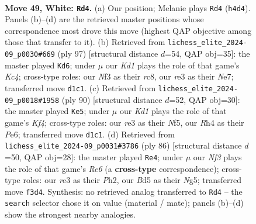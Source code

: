 \documentclass[11pt]{article}
\begin{document}
\clearpage

\begin{figure}[p]\centering
\begin{subfigure}{0.46\textwidth}\centering
\resizebox{\linewidth}{!}{%
\newchessgame
\chessboard[
  setfen={1k1r4/8/8/1b1B1p1N/1P5R/4rN2/2R3P1/3K4 w - - 13 49},
  showmover=false,
  pgfstyle=straightmove, color=movearrow, markmove={h4-d4}
]}
\caption{}
\end{subfigure}\hfill
\begin{subfigure}{0.46\textwidth}\centering
\resizebox{\linewidth}{!}{%
\newchessgame
\chessboard[
  setfen={2R5/4n1p1/p1n1B3/r1k5/P7/8/5K2/R7 b - - 0 49},
  showmover=false,
  pgfstyle=straightmove, color=movearrow, markmove={c5-d6}
]}
\caption{}
\end{subfigure}
\\[4pt]
\begin{subfigure}{0.46\textwidth}\centering
\resizebox{\linewidth}{!}{%
\newchessgame
\chessboard[
  setfen={4k2r/7P/1p2P2R/3p1N2/4nK2/8/8/8 w - - 1 46},
  showmover=false,
  pgfstyle=straightmove, color=movearrow, markmove={f4-e5}
]}
\caption{}
\end{subfigure}\hfill
\begin{subfigure}{0.46\textwidth}\centering
\resizebox{\linewidth}{!}{%
\newchessgame
\chessboard[
  setfen={5rr1/2k5/4R3/3R2N1/5P2/1Pb5/5P1P/6K1 w - - 5 44},
  showmover=false,
  pgfstyle=straightmove, color=movearrow, markmove={e6-e4}
]}
\caption{}
\end{subfigure}
\caption{\textbf{Move 49, White: \texttt{Rd4}.} (a) Our position; Melanie plays \texttt{Rd4} (\texttt{h4d4}). Panels (b)--(d) are the retrieved master positions whose correspondence most drove this move (highest QAP objective among those that transfer to it). (b) Retrieved from \texttt{lichess\_elite\_2024-09\_p0030\#669} (ply 97) [structural distance $d$=54, QAP obj=35]: the master played \texttt{Kd6}; under $\mu$ our \emph{Kd1} plays the role of that game's \emph{Kc4}; cross-type roles: our \emph{N}f3 as their \emph{r}c8, our \emph{r}e3 as their \emph{N}e7; transferred move \texttt{d1c1}. (c) Retrieved from \texttt{lichess\_elite\_2024-09\_p0018\#1958} (ply 90) [structural distance $d$=52, QAP obj=30]: the master played \texttt{Ke5}; under $\mu$ our \emph{Kd1} plays the role of that game's \emph{Kf4}; cross-type roles: our \emph{r}e3 as their \emph{N}f5, our \emph{R}h4 as their \emph{P}e6; transferred move \texttt{d1c1}. (d) Retrieved from \texttt{lichess\_elite\_2024-09\_p0031\#3786} (ply 86) [structural distance $d$=50, QAP obj=28]: the master played \texttt{Re4}; under $\mu$ our \emph{Nf3} plays the role of that game's \emph{Re6} (a \textbf{cross-type} correspondence); cross-type roles: our \emph{r}e3 as their \emph{P}h2, our \emph{B}d5 as their \emph{N}g5; transferred move \texttt{f3d4}. Synthesis: no retrieved analog transferred to \texttt{Rd4} -- the \texttt{search} selector chose it on value (material / mate); panels (b)--(d) show the strongest nearby analogies.}
\label{fig:thought-m96}
\end{figure}
\end{document}
